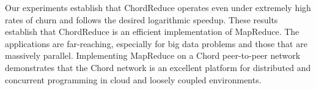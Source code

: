 \documentclass[11pt,letterpaper]{article}
\begin{document}
Our experiments establish that ChordReduce operates even under extremely high rates of churn and follows the desired logarithmic speedup.  
These results establish that ChordReduce is an efficient implementation of MapReduce. 
The applications are far-reaching, especially for big data problems and those that are massively parallel. 
Implementing MapReduce on a Chord peer-to-peer network demonstrates that the Chord network is an excellent platform for distributed and concurrent programming in cloud and loosely coupled environments.
\end{document}
